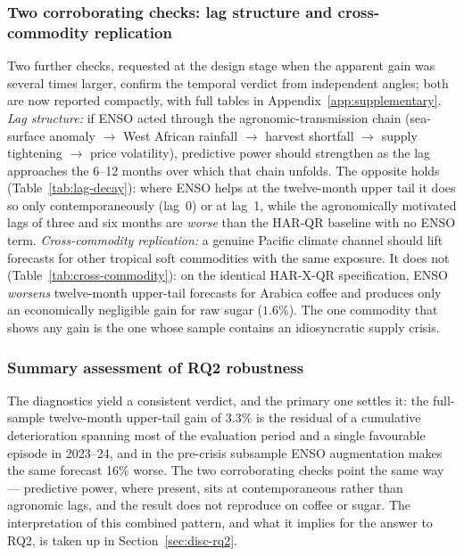 \subsubsection*{Two corroborating checks: lag structure and cross-commodity replication}

Two further checks, requested at the design stage when the apparent gain
was several times larger, confirm the temporal verdict from independent
angles; both are now reported compactly, with full tables in
Appendix~\ref{app:supplementary}. \emph{Lag structure:} if ENSO acted
through the agronomic-transmission chain (sea-surface anomaly $\to$ West
African rainfall $\to$ harvest shortfall $\to$ supply tightening $\to$
price volatility), predictive power should strengthen as the lag
approaches the 6--12 months over which that chain unfolds. The opposite
holds (Table~\ref{tab:lag-decay}): where ENSO helps at the twelve-month
upper tail it does so only contemporaneously (lag~0) or at lag~1, while
the agronomically motivated lags of three and six months are
\emph{worse} than the HAR-QR baseline with no ENSO term. \emph{Cross-commodity
replication:} a genuine Pacific climate channel should lift forecasts for
other tropical soft commodities with the same exposure. It does not
(Table~\ref{tab:cross-commodity}): on the identical HAR-X-QR specification,
ENSO \emph{worsens} twelve-month upper-tail forecasts for Arabica coffee
and produces only an economically negligible gain for raw sugar
($1.6\%$). The one commodity that shows any gain is the one whose sample
contains an idiosyncratic supply crisis.

\subsubsection*{Summary assessment of RQ2 robustness}

The diagnostics yield a consistent verdict, and the primary one settles it:
the full-sample twelve-month upper-tail gain of $3.3\%$ is the residual of
a cumulative deterioration spanning most of the evaluation period and a
single favourable episode in 2023--24, and in the pre-crisis subsample
ENSO augmentation makes the same forecast 16\% worse. The two corroborating
checks point the same way --- predictive power, where present, sits at
contemporaneous rather than agronomic lags, and the result does not
reproduce on coffee or sugar. The interpretation of this combined pattern,
and what it implies for the answer to RQ2, is taken up in
Section~\ref{sec:disc-rq2}.

